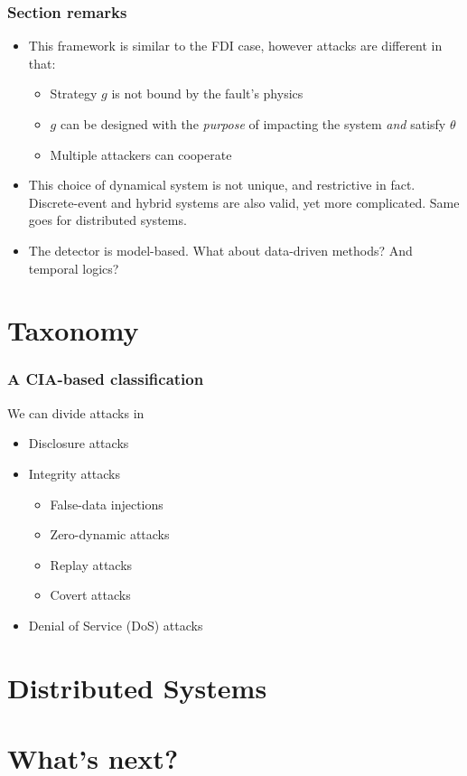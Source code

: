 \documentclass[presentation]{beamer}
\begin{document}
\begin{frame}
	\frametitle{Section remarks}
	\begin{itemize}
		\setlength{\itemsep}{2ex}
		\item<1-> This framework is similar to the FDI case, however attacks are different in that:
		\begin{itemize}
			\item Strategy $g$ is not bound by the fault's physics
			\item $g$ can be designed with the \emph{purpose} of impacting the system \emph{and} satisfy $\theta$
			\item Multiple attackers can cooperate
		\end{itemize}

		\item<2-> This choice of dynamical system is not unique, and restrictive in fact. 
		Discrete-event and hybrid systems are also valid, yet more complicated.
		Same goes for distributed systems.
	
		\item<3> The detector is model-based. What about data-driven methods? And temporal logics? 
	\end{itemize}
\end{frame}

\section{Taxonomy}

\begin{frame}
	\frametitle{A CIA-based classification}

	We can divide attacks in
	\smallskip
	\begin{itemize}
		\setlength{\itemsep}{2ex}
		\item Disclosure attacks
		\item Integrity attacks
		\begin{itemize}
			\item False-data injections
			\item Zero-dynamic attacks
			\item Replay attacks
			\item Covert attacks
		\end{itemize}
		\item Denial of Service (DoS) attacks
	\end{itemize}	
\end{frame}

\section{Distributed Systems}

\section{What's next?}

 
\end{document}

